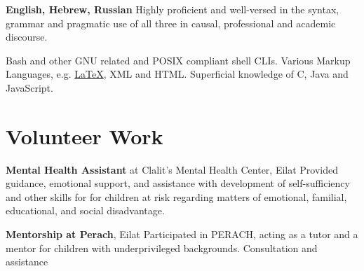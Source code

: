 {\textbf{English, Hebrew, Russian}}
{Highly proficient and well-versed in the syntax, grammar and pragmatic use of all three in causal, professional and academic discourse.}
{}

{Bash and other GNU related and POSIX compliant shell CLIs. Various Markup Languages, e.g. \href{https://github.com/kiril-u/kiril-resume-2021-1/}{\LaTeX}, XML and HTML. Superficial knowledge of C, Java and JavaScript.}
{}

\section{Volunteer Work}

{\textbf{Mental Health Assistant} at Clalit's Mental Health Center, Eilat}
{Provided guidance, emotional support, and assistance with development of self-sufficiency and other skills for for children at risk regarding matters of emotional, familial, educational, and social disadvantage.}
{}

{\textbf{Mentorship at Perach}, Eilat}
{Participated in PERACH, acting as a tutor and a mentor for children with underprivileged backgrounds. Consultation and assistance }
{} 
\unsetLTR
